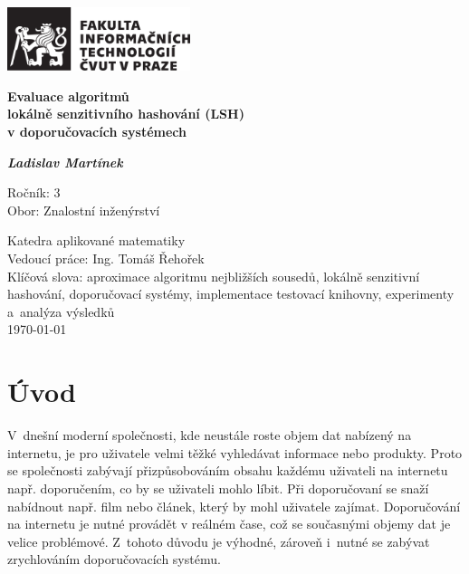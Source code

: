 \documentclass[11pt]{article}
\begin{document}
	\begin{titlepage}
	 \includegraphics[width=0.4\textwidth]{logo_FIT_cb}
		\begin{center}
        \vspace*{4.5cm}
        \huge
        \textbf{Evaluace algoritmů \\lokálně senzitivního hashování (LSH) \\v doporučovacích systémech}
        
        \vspace{3cm}
        \LARGE
        \textbf{ \textit{Ladislav Martínek}}

        \vfill
        \large
        
        Ročník: 3\\
        Obor: Znalostní inženýrství\\
        \vspace{0.5cm}
        
        Katedra aplikované matematiky\\
        Vedoucí práce: Ing. Tomáš Řehořek \\
        \vspace{2.5cm}
        Klíčová slova: aproximace algoritmu nejbližších sousedů, lokálně senzitivní hashování, doporučovací systémy, implementace testovací knihovny, experimenty a~analýza výsledků\\
        \vspace{0.5cm}
        \today
    \end{center}
 	\end{titlepage}
 
 

 
\section{Úvod} 
V~dnešní moderní společnosti, kde neustále roste objem dat nabízený na internetu,
je pro uživatele velmi těžké vyhledávat informace nebo produkty. Proto
se společnosti zabývají přizpůsobováním obsahu každému uživateli na internetu
např. doporučením, co by se uživateli mohlo líbit. Při doporučovaní se
snaží nabídnout např. film nebo článek, který by mohl uživatele zajímat. Doporučování
na internetu je nutné provádět v reálném čase, což se současnými
objemy dat je velice problémové. Z~tohoto důvodu je výhodné,
zároveň i~nutné se zabývat zrychlováním doporučovacích systému.
\end{document}
